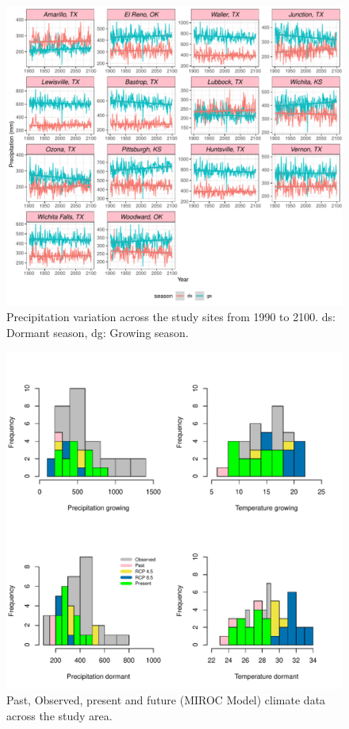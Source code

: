 \documentclass[12pt]{article}\usepackage[]{graphicx}\usepackage[dvipsnames]{xcolor}
\begin{document}
\begin{figure}[H]
		\centering
		\includegraphics[width=0.95\linewidth]{Figures/fig_pr_past_present_future.pdf}
		\caption{Precipitation variation across the study sites from 1990 to 2100.
		ds: Dormant season, dg: Growing season.}
		\label{Sup:pr_variation}
\end{figure}

\begin{figure}[H]
		\centering
		\includegraphics[width=0.95\linewidth]{Figures/MIROC.pdf}
		\caption{Past, Observed, present and future (MIROC Model) climate data across the study area.}
		\label{Sup:projectionMIROC}
\end{figure}
\end{document}
